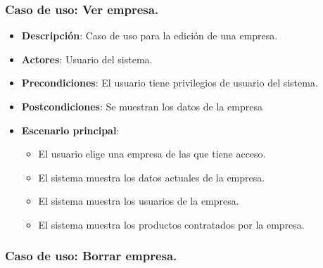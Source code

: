 \documentclass[12pt,a4paperpaper,]{report}
\providecommand{\tightlist}{%
  \setlength{\itemsep}{0pt}\setlength{\parskip}{0pt}}
\begin{document}
\subsubsection{Caso de uso: Ver
empresa.}\label{caso-de-uso-ver-empresa.}

\begin{itemize}
\tightlist
\item
  \textbf{Descripción}: Caso de uso para la edición de una empresa.
\item
  \textbf{Actores}: Usuario del sistema.
\item
  \textbf{Precondiciones}: El usuario tiene privilegios de usuario del
  sistema.
\item
  \textbf{Postcondiciones}: Se muestran los datos de la empresa
\item
  \textbf{Escenario principal}:

  \begin{itemize}
  \tightlist
  \item
    El usuario elige una empresa de las que tiene acceso.
  \item
    El sistema muestra los datos actuales de la empresa.
  \item
    El sistema muestra los usuarios de la empresa.
  \item
    El sistema muestra los productos contratados por la empresa.
  \end{itemize}
\end{itemize}

\subsubsection{Caso de uso: Borrar
empresa.}\label{caso-de-uso-borrar-empresa.}
\end{document}
